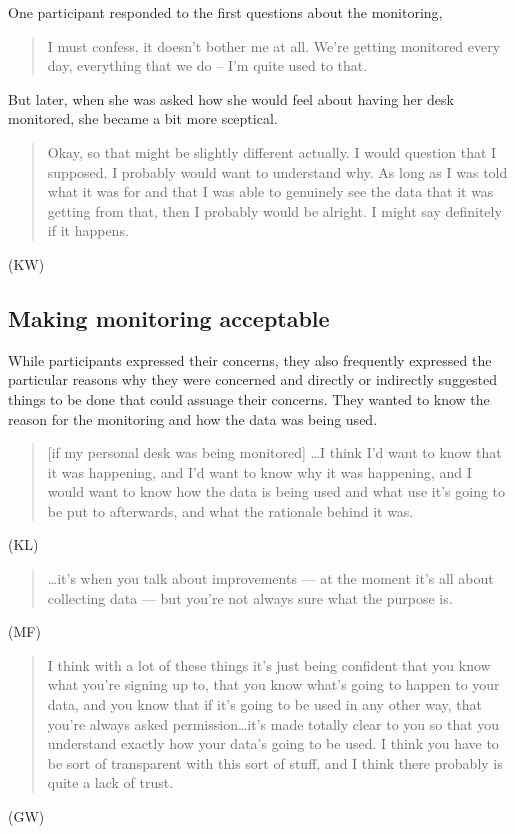 One participant responded to the first questions about the monitoring, 

\begin{quote}I must confess, it doesn’t bother me at all. We’re getting monitored
every day, everything that we do – I’m quite used to that.\end{quote} 

But later,
when she was asked how she would feel about having her desk monitored,
she became a bit more sceptical. 

\begin{quote}Okay, so that might be slightly
different actually. I would question that I supposed. I probably would
want to understand why. As long as I was told what it was for and that
I was able to genuinely see the data that it was getting from that,
then I probably would be alright. I might say definitely if it
happens.\end{quote} (KW)

\subsection{Making monitoring acceptable}
\label{sec:making-monit-accept}

While participants expressed their concerns, they also frequently
expressed the particular reasons why they were concerned and directly
or indirectly suggested things to be done that could assuage their
concerns. They wanted to know the reason for the monitoring and how
the data was being used.

\begin{quote}[if my personal desk was being monitored] \ldots I think I’d want to know
that it was happening, and I’d want to know why it was happening, and
I would want to know how the data is being used and what use it’s
going to be put to afterwards, and what the rationale behind it was.\end{quote}
(KL)

\begin{quote}\ldots it’s when you talk about improvements --- at the moment it’s all
about collecting data --- but you’re not always sure what the purpose
is.\end{quote} (MF)

\begin{quote}I think with a lot of these things it’s just being confident that you
know what you’re signing up to, that you know what’s going to happen
to your data, and you know that if it’s going to be used in any other
way, that you’re always asked permission\ldots it’s made totally clear to
you so that you understand exactly how your data’s going to be used. I
think you have to be sort of transparent with this sort of stuff, and
I think there probably is quite a lack of trust.\end{quote} (GW)

